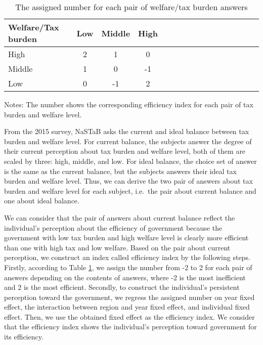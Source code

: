 \documentclass[ review  , 3p ]{elsarticle}
\begin{document}
  \begin{table}

  \caption{\label{tab:efficientQ}The assigned number for each pair of welfare/tax burden answers}
  \centering
  \fontsize{8}{10}\selectfont
  \begin{threeparttable}
  \begin{tabular}[t]{l|cccl|cccl|cccl|ccc}
  \toprule
  Welfare/Tax burden & Low & Middle & High\\
  \midrule
  High & 2 & 1 & 0\\
  Middle & 1 & 0 & -1\\
  Low & 0 & -1 & 2\\
  \bottomrule
  \end{tabular}
  \begin{tablenotes}
  \item Notes: The number shows the corresponding efficiency index for each pair of tax burden and welfare level.
  \end{tablenotes}
  \end{threeparttable}
  \end{table}

  From the 2015 survey, NaSTaB asks the current and ideal balance between tax burden and welfare level.
  For current balance, the subjects answer the degree of their current perception about tax burden and welfare level,
  both of them are scaled by three: high, middle, and low.
  For ideal balance, the choice set of answer is the same as the current balance, but the subjects answers their ideal tax burden and welfare level.
  Thus, we can derive the two pair of answers about tax burden and welfare level for each subject, i.e.~the pair about current balance and one about ideal balance.

  We can consider that the pair of answers about current balance reflect the individual's perception about the efficiency of government
  because the government with low tax burden and high welfare level is clearly more efficient than one with high tax and low welfare.
  Based on the pair about current perception, we construct an index called efficiency index by the following steps.
  Firstly, according to Table \ref{tab:efficientQ},
  we assign the number from -2 to 2 for each pair of answers depending on the contents of answers,
  where -2 is the most inefficient and 2 is the most efficient.
  Secondly, to construct the individual's persistent perception toward the government,
  we regress the assigned number on year fixed effect, the interaction between region and year fixed effect, and individual fixed effect.
  Then, we use the obtained fixed effect as the efficiency index.
  We consider that the efficiency index shows the individual's perception toward government for its efficiency.
\end{document}
